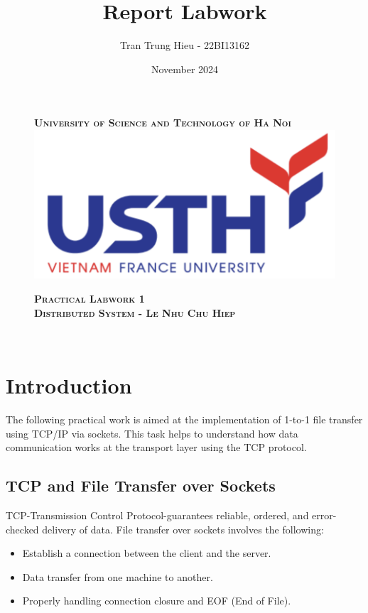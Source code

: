 \documentclass{article}
\title{Report Labwork}
\author{
    Tran Trung Hieu - 22BI13162\\  
}
\date{November 2024}
\begin{document}
\begin{figure}[H]
    \textsc{\large \bfseries University of Science and Technology of Ha Noi}\\[0.5cm]
    \centering
    \includegraphics[width=0.8\linewidth]{usth.png}
    \label{fig:project-overview}

    \vspace{1cm}
 
    \textsc{\large \bfseries Practical Labwork 1}\\[1cm]

    \textsc{\Large \bfseries Distributed System - Le Nhu Chu Hiep}\\[1cm]
\end{figure}


\vspace{1cm}
\begin{center}
    \huge \textbf{\thetitle} \\[0.5cm]
    \Large \theauthor [0.5cm]
    \large \thedate
\end{center}

\vspace{4cm}
\tableofcontents

\newpage
\section{Introduction}
The following practical work is aimed at the implementation of 1-to-1 file transfer using TCP/IP via sockets. This task helps to understand how data communication works at the transport layer using the TCP protocol.

\subsection{TCP and File Transfer over Sockets}
TCP-Transmission Control Protocol-guarantees reliable, ordered, and error-checked delivery of data. File transfer over sockets involves the following:
\begin{itemize}
    \item Establish a connection between the client and the server.
    \item Data transfer from one machine to another.
    \item Properly handling connection closure and EOF (End of File).
\end{itemize}
\end{document}

